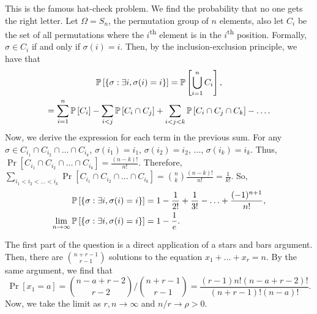 \begin{solution}
    This is the famous hat-check problem. We find the probability that no one
    gets the right letter. Let $\Omega = S_n$, the permutation group of $n$
    elements, also let $C_i$ be the set of all permutations where the
    $i$\textsuperscript{th} element is in the $i$\textsuperscript{th} position.
    Formally, $\sigma \in C_i$ if and only if $\sigma(i) = i$. Then, by the
    inclusion-exclusion principle, we have that 
    \begin{gather*}
        \mathbb{P}\left[{\left\{ \sigma: \exists i, \sigma(i) = i \right\}}\right] = \mathbb{P}\left[{\bigcup_{i=1}^n C_i}\right], \\
        = \sum_{i=1}^n \mathbb{P}\left[{C_i}\right] - \sum_{i < j} \mathbb{P}\left[{C_i \cap C_j}\right] + \sum_{i < j < k} \mathbb{P}\left[{C_i \cap C_j \cap C_k}\right] - \ldots.
    \end{gather*}
    Now, we derive the expression for each term in the previous sum. For any
    $\sigma \in C_{i_1} \cap C_{i_2} \cap \ldots \cap C_{i_k}$, $\sigma(i_1) =
    i_1$, $\sigma(i_2) = i_2$, $\ldots$, $\sigma(i_k) = i_k$. Thus,
    $\Pr\left[{C_{i_1} \cap C_{i_2} \cap \ldots \cap C_{i_k}}\right] =
    \frac{(n-k)!}{n!}$. Therefore, $\sum_{i_1 < i_2 < \ldots < i_k}
    \Pr\left[{C_{i_1} \cap C_{i_2} \cap \ldots \cap C_{i_k}}\right] =
    \binom{n}{k}\frac{(n-k)!}{n!} = \frac{1}{k!}$. So,
    \begin{align*}
        \mathbb{P}\left[{\left\{ \sigma: \exists i, \sigma(i) = i \right\}}\right] &= 1 - \frac{1}{2!} + \frac{1}{3!} - \ldots + \frac{(-1)^{n+1}}{n!}, \\
        \lim_{n\to\infty} \mathbb{P}\left[{\left\{ \sigma: \exists i, \sigma(i) = i \right\}}\right] &= 1 - \frac{1}{e}.
    \end{align*}
\end{solution}
\begin{problem}{6}
    \color{brickred}{Not too sure how to take the limit here.}
\end{problem}
\begin{solution}
    The first part of the question is a direct application of a stars and bars
    argument. Then, there are $\binom{n+r-1}{r-1}$ solutions to the equation
    $x_1 + \ldots + x_r = n$. By the same argument, we find that 
    \[
        \Pr\left[{x_1 = a}\right] = \binom{n-a+r-2}{r-2} / \binom{n+r-1}{r-1} =  \frac{(r-1)n!(n-a+r-2)!}{(n+r-1)!(n-a)!}.
    \]
    Now, we take the limit as $r,n\to\infty$ and $n/r \to \rho > 0$.
\end{solution}
\begin{problem}{7}
\end{problem}
